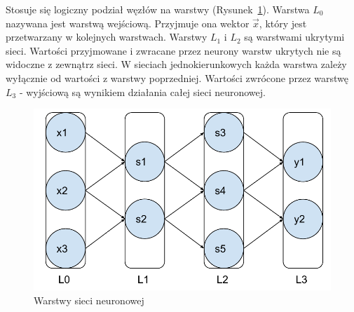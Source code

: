 \documentclass[a4paper,12pt,twoside,openany]{report}
\newcommand{\Rys}[1]{(Rysunek~\ref{#1})}
\begin{document}
Stosuje się logiczny podział węzłów na warstwy \Rys{rys:mlp:warstwy}.
Warstwa $L_0$ nazywana jest warstwą wejściową.
Przyjmuje ona wektor $\vec x$, który jest przetwarzany w kolejnych warstwach.
Warstwy $L_1$ i $L_2$ są warstwami ukrytymi sieci. 
Wartości przyjmowane i zwracane przez neurony warstw ukrytych nie są widoczne z zewnątrz sieci.
W sieciach jednokierunkowych każda warstwa zależy wyłącznie od wartości z warstwy poprzedniej.
Wartości zwrócone przez warstwę $L_3$ - wyjściową są wynikiem działania całej sieci neuronowej.
\begin{figure}[h]
	\centering
	\includegraphics[width=\textwidth]{ann-warstwy}
	\caption{Warstwy sieci neuronowej}
	\label{rys:mlp:warstwy}
\end{figure}
\end{document}
